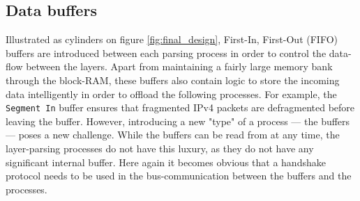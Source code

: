 \subsection{Data buffers} \label{sec:data_buffers}
Illustrated as cylinders on figure \ref{fig:final_design}, First-In, First-Out (FIFO)
buffers are introduced between each parsing process in order to control the data-flow 
between the layers. Apart from maintaining a fairly large memory bank through 
the block-RAM, these buffers also contain logic to store the incoming data
intelligently in order to offload the following processes. For example, the
\texttt{Segment In} buffer ensures that fragmented IPv4 packets are defragmented
before leaving the buffer.
However, introducing a new "type" of a process --- the buffers --- poses a new 
challenge. While the buffers can be read from at any time, the layer-parsing
processes do not have this luxury, as they do not have any significant internal
buffer. Here again it becomes obvious that a handshake protocol needs to be used 
in the bus-communication between the buffers and the processes.

